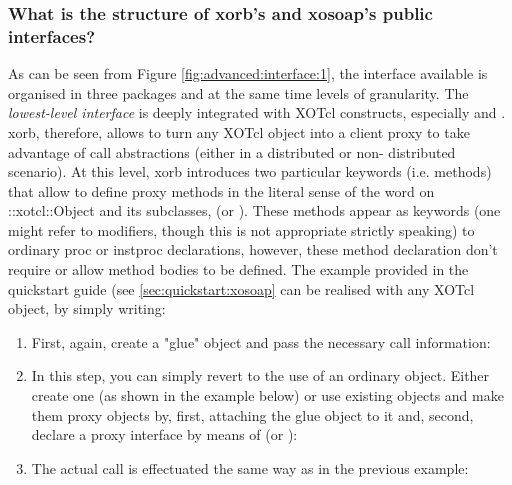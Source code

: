  \subsubsection{What is the structure of xorb's and xosoap's public interfaces?}\label{sec:advanced:interface:what}
As can be seen from Figure \ref{fig:advanced:interface:1}, the interface available is organised in three 
packages and at the same time levels of granularity. The \emph{lowest-level interface} is deeply 
integrated with XOTcl constructs, especially  and . xorb, therefore, allows to turn 
any XOTcl object into a client proxy to take advantage of call abstractions (either in a distributed or non-
distributed scenario). At this level, xorb introduces two particular keywords (i.e. methods) that allow to 
define proxy methods in the literal sense of the word on ::xotcl::Object and its subclasses, 
(or ). These methods appear as keywords (one might refer to modifiers, though this is 
not appropriate strictly speaking) to ordinary proc or instproc declarations, however, these method 
declaration don't require or allow method bodies to be defined. The example provided in the quickstart 
guide (see \ref{sec:quickstart:xosoap} can be realised with any XOTcl object, by simply writing:
  \begin{enumerate}
\item First, again, create a "glue" object and pass the necessary call information: 
\item In this step, you can simply revert to the use of an ordinary object. Either create one (as shown in the example below) or use existing objects and make them proxy objects by, first, attaching the glue object to it and, second, declare a proxy interface by means of  (or ):


\item The actual call is effectuated the same way as in the previous example:

  \end{enumerate}

